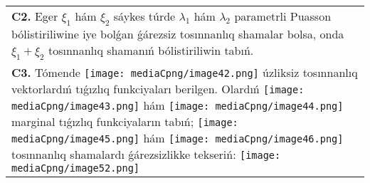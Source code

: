 \documentclass{article}
\begin{document}
\begin{tabular}{m{17cm}}
 \\
\textbf{C2.} Eger \(\xi_{1}\) hám \(\xi_{2}\) sáykes túrde \(\lambda_{1}\) hám \(\lambda_{2}\) parametrli Puasson bólistiriliwine iye bolǵan ǵárezsiz tosınnanlıq shamalar bolsa, onda \(\xi_{1} + \xi_{2}\) tosınnanlıq shamanıń bólistiriliwin tabıń.
 \\
\textbf{C3.} Tómende \texttt{[image: mediaCpng/image42.png]} úzliksiz tosınnanlıq vektorlardıń tıǵızlıq funkciyaları berilgen. Olardıń \texttt{[image: mediaCpng/image43.png]} hám \texttt{[image: mediaCpng/image44.png]} marginal tıǵızlıq funkciyaların tabıń; \texttt{[image: mediaCpng/image45.png]} hám \texttt{[image: mediaCpng/image46.png]} tosınnanlıq shamalardı ǵárezsizlikke tekseriń: \texttt{[image: mediaCpng/image52.png]}
 \\

\end{tabular}
\vspace{1cm}
\end{document}
